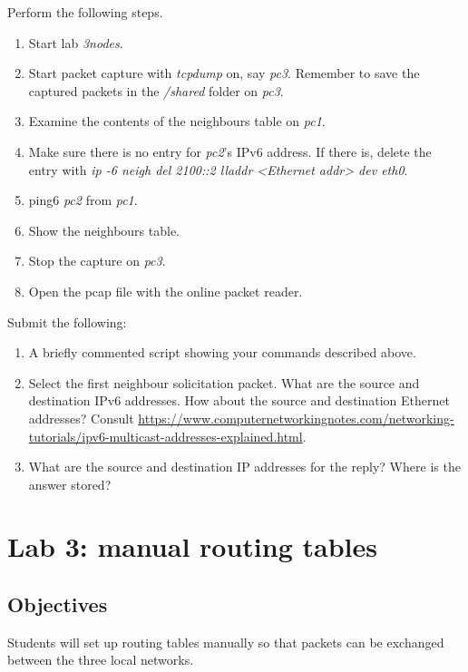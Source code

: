 \documentclass[12pt]{book}
\begin{document}
\begin{enumerate}[label=\arabic*.]
\begin{enumerate}[label=\arabic*.]
  Perform the following steps.
  \begin{enumerate}[label=(\roman*)]
  \item Start lab \emph{3nodes}.
  \item Start packet capture with \emph{tcpdump} on, say \emph{pc3}. Remember to save the captured packets in the \emph{/shared} folder on \emph{pc3}.
  \item Examine the contents of the neighbours table on \emph{pc1}.
  \item Make sure there is no entry for \emph{pc2}'s IPv6 address. If there is, delete the entry with \emph{ip -6 neigh del 2100::2 lladdr <Ethernet addr> dev eth0}.
  \item ping6 \emph{pc2} from \emph{pc1}.
  \item Show the neighbours table.
  \item Stop the capture on \emph{pc3}.
    \item Open the pcap file with the online packet reader. 
  \end{enumerate}

      \smallskip
      Submit the following:
  \begin{enumerate}[label=(\alph*)]
  \item A briefly commented script showing your commands described above.
  \item Select the first neighbour solicitation packet. What are the source and destination IPv6 addresses. How about the source and destination Ethernet addresses?
    Consult \url{https://www.computernetworkingnotes.com/networking-tutorials/ipv6-multicast-addresses-explained.html}.
    \item What are the source and destination IP addresses for the reply? Where is the answer stored?
  \end{enumerate}
\end{enumerate}



\chapter{Lab 3: manual routing tables}

\section{Objectives}

Students will set up routing tables manually so that packets can be exchanged between the three local networks.


\end{enumerate}
\end{document}
